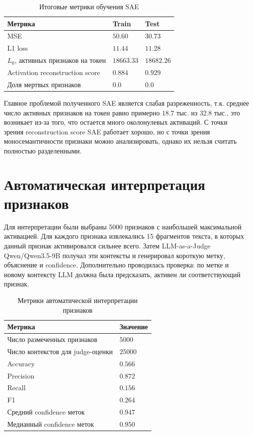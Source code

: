 \documentclass[a4paper,14pt]{extreport}
\begin{document}
\begin{table}[H]
    \centering
    \small
    \caption{Итоговые метрики обучения SAE}
    \label{tab:sae_training_metrics}
    \begin{tabular}{p{}p{}p{}}
        \toprule
        Метрика & Train & Test \\
        \midrule
        MSE & $50.60$ & $30.73$ \\
        L1 loss & $11.44$ & $11.28$ \\
        $L_0$, активных признаков на токен & $18663.33$ & $18682.26$ \\
        Activation reconstruction score & $0.884$ & $0.929$ \\
        Доля мертвых признаков & $0.0$ & $0.0$ \\
        \bottomrule
    \end{tabular}
\end{table}

Главное проблемой полученного SAE является слабая разреженность, т.к. среднее число
активных признаков на токен равно примерно $18.7$ тыс. из $32.8$ тыс., 
это возникает из-за того, что остается много околонулевых активаций. 
С точки зрения reconstruction score SAE работает
хорошо, но с точки зрения моносемантичности признаки можно анализировать, однако их нельзя считать полностью
разделенными.

\section{Автоматическая интерпретация признаков}

Для интерпретации были выбраны 5000 признаков с наибольшей максимальной активацией.
Для каждого признака извлекались 15 
фрагментов текста, в которых данный признак активировался сильнее всего. Затем LLM-as-a-Judge
Qwen/Qwen3.5-9B получал эти контексты и генерировал короткую метку, объяснение
и confidence. Дополнительно проводилась проверка: по метке и новому контексту
LLM должна была предсказать, активен ли соответствующий признак.

\begin{table}[H]
    \centering
    \small
    \caption{Метрики автоматической интерпретации признаков}
    \label{tab:autolabel_metrics}
    \begin{tabular}{p{}p{}}
        \toprule
        Метрика & Значение \\
        \midrule
        Число размеченных признаков & $5000$ \\
        Число контекстов для judge-оценки & $25000$ \\
        Accuracy & $0.566$ \\
        Precision & $0.872$ \\
        Recall & $0.156$ \\
        F1 & $0.264$ \\
        Средний confidence меток & $0.947$ \\
        Медианный confidence меток & $0.950$ \\
        \bottomrule
    \end{tabular}
\end{table}
\end{document}
